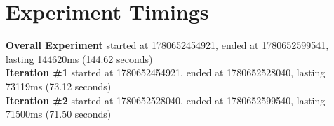 \documentclass{article}
\begin{document}
\section*{Experiment Timings}
\textbf{Overall Experiment} started at 1780652454921, ended at 1780652599541, lasting 144620ms (144.62 seconds)
\\\textbf{Iteration \#1} started at 1780652454921, ended at 1780652528040, lasting 73119ms (73.12 seconds)
\\\textbf{Iteration \#2} started at 1780652528040, ended at 1780652599540, lasting 71500ms (71.50 seconds)
\end{document}
